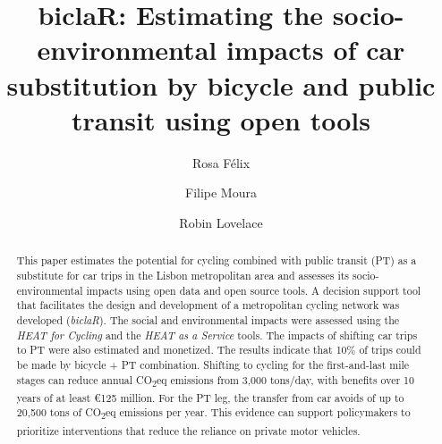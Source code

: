 \documentclass[runningheads]{llncs}
\begin{document}
\title{biclaR: Estimating the socio-environmental impacts of car
substitution by bicycle and public transit using open tools}
%
%
\author{Rosa Félix \and Filipe
Moura \and Robin
Lovelace}


%


\maketitle              %
%
\begin{abstract}
This paper estimates the potential for cycling combined with public
transit (PT) as a substitute for car trips in the Lisbon metropolitan
area and assesses its socio-environmental impacts using open data and
open source tools. A decision support tool that facilitates the design
and development of a metropolitan cycling network was developed
(\emph{biclaR}). The social and environmental impacts were assessed
using the \emph{HEAT for Cycling} and the \emph{HEAT as a Service}
tools. The impacts of shifting car trips to PT were also estimated and
monetized. The results indicate that 10\% of trips could be made by
bicycle + PT combination. Shifting to cycling for the first-and-last
mile stages can reduce annual CO\textsubscript{2}eq emissions from 3,000
tons/day, with benefits over 10 years of at least €125 million. For the
PT leg, the transfer from car avoids of up to 20,500 tons of
CO\textsubscript{2}eq emissions per year. This evidence can support
policymakers to prioritize interventions that reduce the reliance on
private motor vehicles.


\end{abstract}
\end{document}

